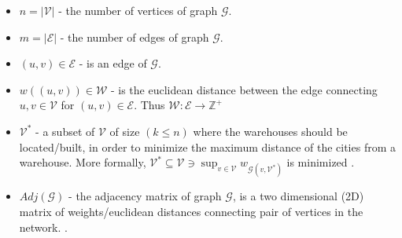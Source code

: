 \documentclass[longpaper, english, final, times]{revdetua}
\begin{document}
	
	\begin{keywords}%
		\begin{itemize}
			\item $n=\mathcal{|V|}$ - the number of vertices of graph $\mathcal{G}$.
			\item $m=\mathcal{|E|}$ - the number of edges of graph $\mathcal{G}$.
			\item $(u,v) \in \mathcal{E}$ - is an edge of $\mathcal{G}$.
			\item $w((u,v)) \in \mathcal{W}$ - is the euclidean distance between the edge connecting $u, v \in \mathcal{V}$ for $(u,v)\in \mathcal{E}$. Thus $\mathcal{W}:\mathcal{E}\rightarrow \mathbb{Z^+}$
			\item $\mathcal{V^{*}}$ - a subset of $\mathcal{V}$ of size $\left(k\leq n\right)$ where the warehouses should be located/built, in order to minimize the maximum distance of the cities from a warehouse. More formally, $\mathcal{V^{*}}\subseteq \mathcal{V} \ni \sup_{v\in \mathcal{V}}w_{\mathcal{G}(v, \mathcal{V^{*}})}$ is minimized \cite{kcenterProblem}.
			\item $Adj(\mathcal{G})$ - the adjacency matrix of graph $\mathcal{G}$, is a two dimensional (2D) matrix of weights/euclidean distances connecting pair of vertices in the network. \cite{adjacencymatrixdefinition}.
		\end{itemize}
	\end{keywords}
	
\end{document}
